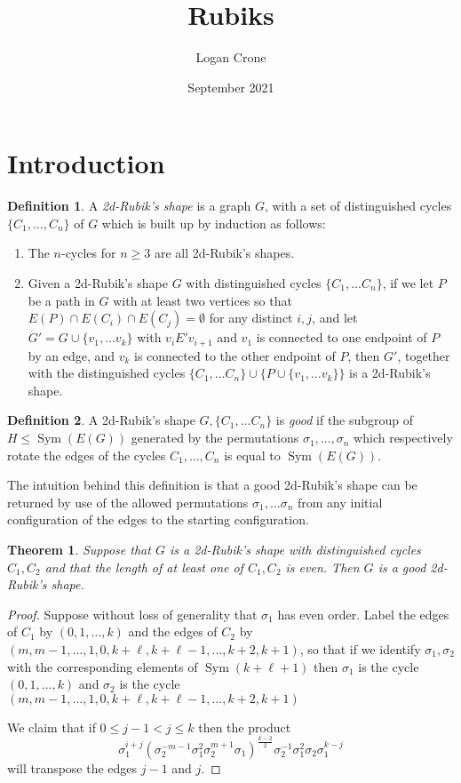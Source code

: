 \documentclass{amsart}
\title{Rubiks}
\author{Logan Crone}
\date{September 2021}
\newtheorem{theorem}{Theorem}
\theoremstyle{definition}
\newtheorem{definition}{Definition}
\DeclareMathOperator{\Sym}{Sym}
\begin{document}
\maketitle

\section{Introduction}

\begin{definition}
A \emph{2d-Rubik's shape} is a graph $G$, with a set of distinguished cycles $\{C_1, \dots, C_n\}$ of $G$  which is built up by induction as follows:

\begin{enumerate}
\item The $n$-cycles for $n \geq 3$ are all 2d-Rubik's shapes.
\item Given a 2d-Rubik's shape $G$ with distinguished cycles $\{C_1, \dots C_n\}$, if we let $P$ be a path in $G$ with at least two vertices so that $E(P) \cap E(C_i) \cap E(C_j) = \emptyset$ for any distinct $i, j$, and let $G' = G \cup \{v_1, \dots v_k\}$ with $v_i E' v_{i+1}$ and $v_1$ is connected to one endpoint of $P$ by an edge, and $v_k$ is connected to the other endpoint of $P$, then $G'$, together with the distinguished cycles $\{C_1, \dots C_n\} \cup \{P \cup \{v_1, \dots v_k\}\}$ is a 2d-Rubik's shape.
\end{enumerate}
\end{definition}

\begin{definition}
A 2d-Rubik's shape $G, \{C_1, \dots C_n\}$ is \emph{good} if the subgroup of $H \leq \Sym(E(G))$ generated by the permutations $\sigma_1, \dots, \sigma_n$ which respectively rotate the edges of the cycles $C_1, \dots, C_n$ is equal to $\Sym(E(G))$.
\end{definition}
The intuition behind this definition is that a good 2d-Rubik's shape can be returned by use of the allowed permutations $\sigma_1, \dots \sigma_n$ from any initial configuration of the edges to the starting configuration.

\begin{theorem}
Suppose that $G$ is a 2d-Rubik's shape with distinguished cycles ${C_1, C_2}$ and that the length of at least one of $C_1, C_2$ is even.  Then $G$ is a good 2d-Rubik's shape.
\end{theorem}
\begin{proof}
Suppose without loss of generality that $\sigma_1$ has even order.
Label the edges of $C_1$ by $(0, 1, \dots, k)$ and the edges of $C_2$ by $(m, m-1, \dots, 1, 0, k+\ell, k+\ell-1, \dots, k+2, k+1)$, so that if we identify $\sigma_1, \sigma_2$ with the corresponding elements of $\Sym(k+\ell+1)$ then $\sigma_1$ is the cycle $(0, 1, \dots, k)$ and $\sigma_2$ is the cycle $(m, m-1, \dots, 1, 0, k+\ell, k+\ell-1, \dots, k+2, k+1)$

We claim that if $0\leq j-1 < j \leq k$ then the product
\[\sigma_1^{i+j}(\sigma_2^{-m-1}\sigma_1^2\sigma_2^{m+1}\sigma_1)^{\frac{k-2}{2}}\sigma_2^{-1}\sigma_1^2\sigma_2\sigma_1^{k-j}\]
will transpose the edges $j-1$ and $j$.
\end{proof}
\end{document}
